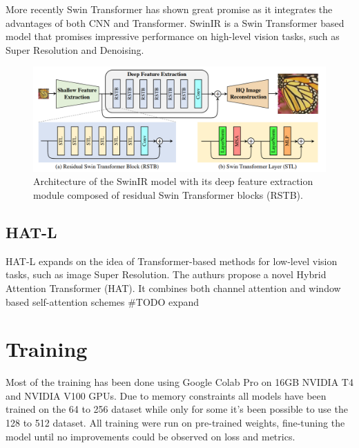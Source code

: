 More recently Swin Transformer\cite{liu2021swin}  has shown great promise as it integrates the advantages of both CNN and
Transformer. SwinIR\cite{liang2021swinir} is a Swin Transformer based model that promises impressive performance on high-level vision tasks, such as Super Resolution and Denoising.

\begin{figure}[H]
  \centering
  \includegraphics[scale=0.35]{figures/SwinIR.png}
  \caption{Architecture of the SwinIR model with its deep feature extraction module composed of residual Swin Transformer blocks (RSTB).}
  \label{img:swinir}
\end{figure}

\section{HAT-L}
\label{subsec:hatl}

HAT-L expands on the idea of Transformer-based methods for low-level vision tasks, such as image Super Resolution. The authurs propose a novel Hybrid Attention Transformer (HAT). It combines both channel attention and window based self-attention schemes \#TODO expand

\chapter{Training}
\label{cha:Training}

Most of the training has been done using Google Colab Pro on 16GB NVIDIA T4 and NVIDIA V100 GPUs. Due to memory constraints all models have been trained on the 64 to 256 dataset while only for some it's been possible to use the 128 to 512 dataset.
All training were run on pre-trained weights, fine-tuning the model until no improvements could be observed on loss and metrics.


